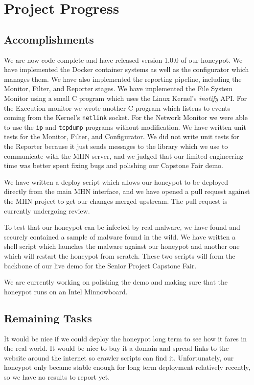 \documentclass[10pt,conference,draftclsnofoot,onecolumn]{IEEEtran}
\begin{document}
\section{Project Progress}
\subsection{Accomplishments}
We are now code complete and have released version 1.0.0 of our honeypot. We have implemented the Docker container systems as well as the configurator which manages them. We have also implemented the reporting pipeline, including the Monitor, Filter, and Reporter stages. We have implemented the File System Monitor using a small C program which uses the Linux Kernel’s \textit{inotify} API. For the Execution monitor we wrote another C program which listens to events coming from the Kernel’s \texttt{netlink} socket. For the Network Monitor we were able to use the \texttt{ip} and \texttt{tcpdump} programs without modification. We have written unit tests for the Monitor, Filter, and Configurator. We did not write unit tests for the Reporter because it just sends messages to the library which we use to communicate with the MHN server, and we judged that our limited engineering time was better spent fixing bugs and polishing our Capstone Fair demo.

We have written a deploy script which allows our honeypot to be deployed directly from the main MHN interface, and we have opened a pull request against the MHN project to get our changes merged upstream. The pull request is currently undergoing review.

To test that our honeypot can be infected by real malware, we have found and securely contained a sample of malware found in the wild. We have written a shell script which launches the malware against our honeypot and another one which will restart the honeypot from scratch. These two scripts will form the backbone of our live demo for the Senior Project Capstone Fair.

We are currently working on polishing the demo and making sure that the honeypot runs on an Intel Minnowboard.

\subsection{Remaining Tasks}
It would be nice if we could deploy the honeypot long term to see how it fares in the real world. It would be nice to buy it a domain and spread links to the website around the internet so crawler scripts can find it. Unfortunately, our honeypot only became stable enough for long term deployment relatively recently, so we have no results to report yet.
\end{document}
